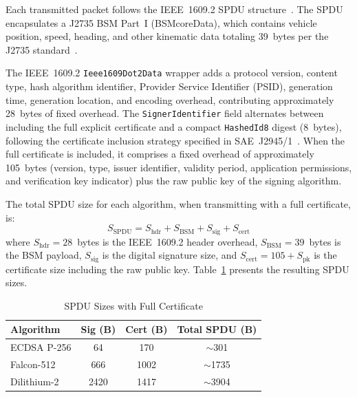 \documentclass[letterpaper,journal]{IEEEtran}
\begin{document}
Each transmitted packet follows the IEEE~1609.2 SPDU structure~\cite{ieee_16092}. The SPDU encapsulates a J2735 BSM Part~I (BSMcoreData), which contains vehicle position, speed, heading, and other kinematic data totaling 39~bytes per the J2735 standard~\cite{sae_j2735}.

The IEEE~1609.2 \texttt{Ieee1609Dot2Data} wrapper adds a protocol version, content type, hash algorithm identifier, Provider Service Identifier (PSID), generation time, generation location, and encoding overhead, contributing approximately 28~bytes of fixed overhead. The \texttt{SignerIdentifier} field alternates between including the full explicit certificate and a compact \texttt{HashedId8} digest (8~bytes), following the certificate inclusion strategy specified in SAE~J2945/1~\cite{sae_j29451}. When the full certificate is included, it comprises a fixed overhead of approximately 105~bytes (version, type, issuer identifier, validity period, application permissions, and verification key indicator) plus the raw public key of the signing algorithm.

The total SPDU size for each algorithm, when transmitting with a full certificate, is:
\begin{equation}
    S_\text{SPDU} = S_\text{hdr} + S_\text{BSM} + S_\text{sig} + S_\text{cert}
    \label{eq:spdu_size}
\end{equation}
where $S_\text{hdr} = 28$~bytes is the IEEE~1609.2 header overhead, $S_\text{BSM} = 39$~bytes is the BSM payload, $S_\text{sig}$ is the digital signature size, and $S_\text{cert} = 105 + S_\text{pk}$ is the certificate size including the raw public key. Table~\ref{tab:spdu_sizes} presents the resulting SPDU sizes.

\begin{table}[!htbp]
    \caption{SPDU Sizes with Full Certificate}
    \label{tab:spdu_sizes}
    \centering
    \begin{tabular}{lccc}
    \toprule
    \textbf{Algorithm} & \textbf{Sig (B)} & \textbf{Cert (B)} & \textbf{Total SPDU (B)} \\
    \midrule
    ECDSA P-256    & 64   & 170  & $\sim$301 \\
    Falcon-512     & 666  & 1002 & $\sim$1735 \\
    Dilithium-2    & 2420 & 1417 & $\sim$3904 \\
    \bottomrule
    \end{tabular}
\end{table}

\end{document}
